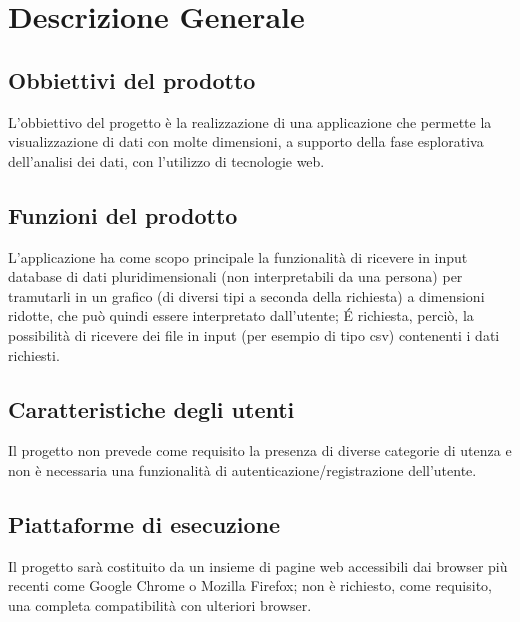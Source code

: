 \section{Descrizione Generale}
\subsection{Obbiettivi del prodotto}
L'obbiettivo del progetto è la realizzazione di una applicazione che permette la visualizzazione di dati con molte dimensioni, a supporto della fase esplorativa dell'analisi dei dati, con l'utilizzo di tecnologie web.
\subsection{Funzioni del prodotto}
L'applicazione ha come scopo principale la funzionalità di ricevere in input database di dati pluridimensionali (non interpretabili da una persona) per tramutarli in un grafico (di diversi tipi a seconda della richiesta) a dimensioni ridotte, che può quindi essere interpretato dall'utente; \'E richiesta, perciò, la possibilità di ricevere dei file in input (per esempio di tipo csv) contenenti i dati richiesti.
\subsection{Caratteristiche degli utenti}
Il progetto non prevede come requisito la presenza di diverse categorie di utenza e non è necessaria una funzionalità di autenticazione/registrazione dell'utente.
\subsection{Piattaforme di esecuzione}
Il progetto sarà costituito da un insieme di pagine web accessibili dai browser più recenti come Google Chrome o Mozilla Firefox; non è richiesto, come requisito, una completa compatibilità con ulteriori browser.
